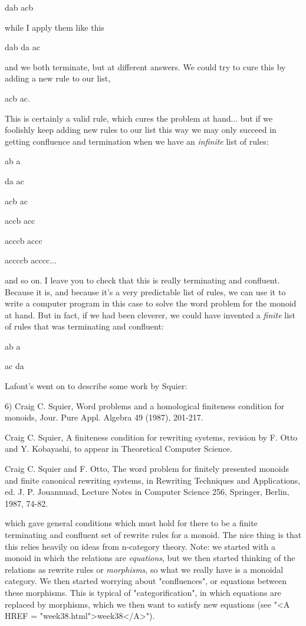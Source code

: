 dab \to  acb 

while I apply them like this

dab \to  da \to  ac

and we both terminate, but at different answers.  We could try to cure
this by adding a new rule to our list, 

acb \to  ac.

This is certainly a valid rule, which cures the problem at hand...
but if we foolishly keep adding new rules to our list this way we may
only succeed in getting confluence and termination when we have an
\emph{infinite} list of rules: 

ab \to  a 

da \to  ac 

acb \to  ac 

accb \to  acc 

acccb \to  accc 

accccb \to  acccc... 


and so on.  I leave you to check that this is really terminating and
confluent.  Because it is, and because it's a very predictable list of
rules, we can use it to write a computer program in this case to solve
the word problem for the monoid at hand.  But in fact, if we had been
cleverer, we could have invented a \emph{finite} list of rules that was
terminating and confluent:

ab \to  a 

ac \to  da

Lafont's went on to describe some work by Squier:

6) Craig C. Squier, Word problems and a homological finiteness condition
for monoids, Jour. Pure Appl. Algebra 49 (1987), 201-217.

Craig C. Squier, A finiteness condition for rewriting systems, revision by F.
Otto and Y. Kobayashi, to appear in Theoretical Computer Science.

Craig C. Squier and F. Otto, The word problem for finitely presented
monoids and finite canonical rewriting systems, in Rewriting Techniques 
and Applications, ed. J. P. Jouannuad, Lecture Notes in Computer Science 
256, Springer, Berlin, 1987, 74-82.

which gave general conditions which must hold for there to be a finite
terminating and confluent set of rewrite rules for a monoid.  The nice
thing is that this relies heavily on ideas from n-category theory.
Note: we started with a monoid in which the relations are \emph{equations},
but we then started thinking of the relations as rewrite rules or
\emph{morphisms}, so what we really have is a monoidal category.  We then
started worrying about "confluences", or equations between these
morphisms.  This is typical of "categorification", in which equations
are replaced by morphisms, which we then want to satisfy new equations
(see "<A HREF = "week38.html">week38</A>").

